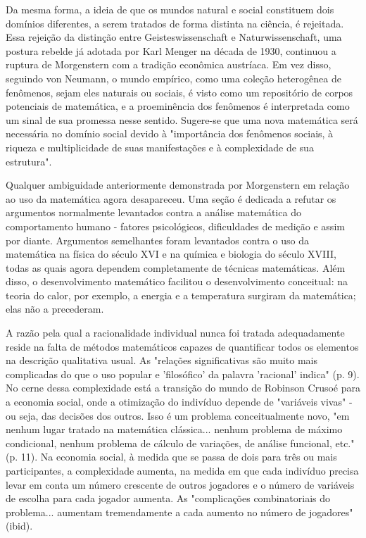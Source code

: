 \documentclass[12pt]{article}
\begin{document}
Da mesma forma, a ideia de que os mundos natural e social constituem dois domínios diferentes, a serem tratados de forma distinta na ciência, é rejeitada. Essa rejeição da distinção entre Geisteswissenschaft e Naturwissenschaft, uma postura rebelde já adotada por Karl Menger na década de 1930, continuou a ruptura de Morgenstern com a tradição econômica austríaca. Em vez disso, seguindo von Neumann, o mundo empírico, como uma coleção heterogênea de fenômenos, sejam eles naturais ou sociais, é visto como um repositório de corpos potenciais de matemática, e a proeminência dos fenômenos é interpretada como um sinal de sua promessa nesse sentido. Sugere-se que uma nova matemática será necessária no domínio social devido à "importância dos fenômenos sociais, à riqueza e multiplicidade de suas manifestações e à complexidade de sua estrutura".

Qualquer ambiguidade anteriormente demonstrada por Morgenstern em relação ao uso da matemática agora desapareceu. Uma seção é dedicada a refutar os argumentos normalmente levantados contra a análise matemática do comportamento humano - fatores psicológicos, dificuldades de medição e assim por diante. Argumentos semelhantes foram levantados contra o uso da matemática na física do século XVI e na química e biologia do século XVIII, todas as quais agora dependem completamente de técnicas matemáticas. Além disso, o desenvolvimento matemático facilitou o desenvolvimento conceitual: na teoria do calor, por exemplo, a energia e a temperatura surgiram da matemática; elas não a precederam.

A razão pela qual a racionalidade individual nunca foi tratada adequadamente reside na falta de métodos matemáticos capazes de quantificar todos os elementos na descrição qualitativa usual. As "relações significativas são muito mais complicadas do que o uso popular e 'filosófico' da palavra 'racional' indica" (p. 9). No cerne dessa complexidade está a transição do mundo de Robinson Crusoé para a economia social, onde a otimização do indivíduo depende de "variáveis vivas" - ou seja, das decisões dos outros. Isso é um problema conceitualmente novo, "em nenhum lugar tratado na matemática clássica... nenhum problema de máximo condicional, nenhum problema de cálculo de variações, de análise funcional, etc." (p. 11). Na economia social, à medida que se passa de dois para três ou mais participantes, a complexidade aumenta, na medida em que cada indivíduo precisa levar em conta um número crescente de outros jogadores e o número de variáveis de escolha para cada jogador aumenta. As "complicações combinatoriais do problema... aumentam tremendamente a cada aumento no número de jogadores" (ibid).
\end{document}
